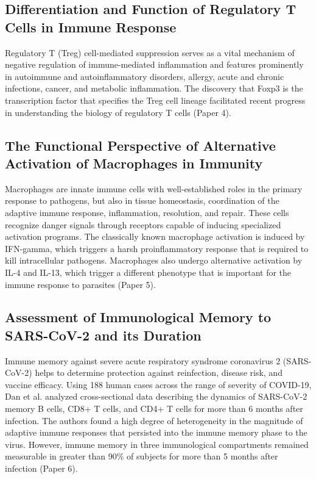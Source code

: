 \documentclass{article}
\begin{document}
\subsection{Differentiation and Function of Regulatory T Cells in Immune Response}

Regulatory T (Treg) cell-mediated suppression serves as a vital mechanism of negative regulation of immune-mediated inflammation and features prominently in autoimmune and autoinflammatory disorders, allergy, acute and chronic infections, cancer, and metabolic inflammation. The discovery that Foxp3 is the transcription factor that specifies the Treg cell lineage facilitated recent progress in understanding the biology of regulatory T cells (Paper 4).

\subsection{The Functional Perspective of Alternative Activation of Macrophages in Immunity}

Macrophages are innate immune cells with well-established roles in the primary response to pathogens, but also in tissue homeostasis, coordination of the adaptive immune response, inflammation, resolution, and repair. These cells recognize danger signals through receptors capable of inducing specialized activation programs. The classically known macrophage activation is induced by IFN-gamma, which triggers a harsh proinflammatory response that is required to kill intracellular pathogens. Macrophages also undergo alternative activation by IL-4 and IL-13, which trigger a different phenotype that is important for the immune response to parasites (Paper 5).

\subsection{Assessment of Immunological Memory to SARS-CoV-2 and its Duration}

Immune memory against severe acute respiratory syndrome coronavirus 2 (SARS-CoV-2) helps to determine protection against reinfection, disease risk, and vaccine efficacy. Using 188 human cases across the range of severity of COVID-19, Dan et al. analyzed cross-sectional data describing the dynamics of SARS-CoV-2 memory B cells, CD8+ T cells, and CD4+ T cells for more than 6 months after infection. The authors found a high degree of heterogeneity in the magnitude of adaptive immune responses that persisted into the immune memory phase to the virus. However, immune memory in three immunological compartments remained measurable in greater than 90\% of subjects for more than 5 months after infection (Paper 6).
\end{document}
